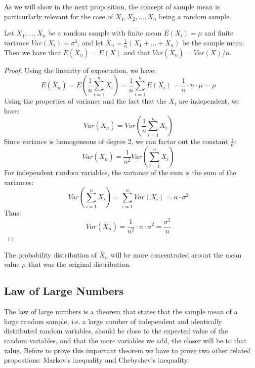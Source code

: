 As we will show in the next proposition, the concept of sample mean is particurlarly relevant for the case of $X_1, X_2, \ldots, X_n$ being a random sample.

\begin{proposition}\label{prop:sample_mean}
Let $X_1, \ldots, X_n$ be a random sample with finite mean $E \left( X_i \right) = \mu$ and finite variance $Var \left( X_i \right) = \sigma^2$, and let $\overline {X}_n = \frac {1}{n} \left( X_1 + \ldots + X_n \right)$ be the sample mean. Then we have that $E\left(\bar{X}_{n}\right)=E(X)$ and that $Var\left(\bar{X}_{n}\right)=Var(X)/n$.
\end{proposition}
\begin{proof}
Using the linearity of expectation, we have:
\[
E\left(\overline{X}_n\right) = E\left(\frac{1}{n} \sum_{i=1}^{n} X_i\right) = \frac{1}{n} \sum_{i=1}^{n} E(X_i) = \frac{1}{n} \cdot n \cdot \mu = \mu
\]
Using the properties of variance and the fact that the \(X_i\) are independent, we have:
\[
Var\left(\overline{X}_n\right) = Var\left(\frac{1}{n} \sum_{i=1}^{n} X_i\right)
\]
Since variance is homogeneous of degree 2, we can factor out the constant \( \frac{1}{n} \):
\[
Var\left(\overline{X}_n\right) = \frac{1}{n^2} Var\left(\sum_{i=1}^{n} X_i\right)
\]
For independent random variables, the variance of the sum is the sum of the variances:
\[
Var\left(\sum_{i=1}^{n} X_i\right) = \sum_{i=1}^{n} Var(X_i) = n \cdot \sigma^2
\]
Thus:
\[
Var\left(\overline{X}_n\right) = \frac{1}{n^2} \cdot n \cdot \sigma^2 = \frac{\sigma^2}{n}
\]
\end{proof}

The probability distribution of $\bar{X}_n$ will be more concentrated arount the mean value $\mu$ that was the original distribution. 


\subsection{Law of Large Numbers}

The law of large numbers is a theorem that states that the sample mean of a large random sample, i.e. a large number of independent and identically distributed random variables, should be close to the expected value of the random variables, and that the more variables we add, the closer will be to that value. Before to prove this important theorem we have to prove two other related propostions: Markov's inequality and Chebyshev's inequality.

